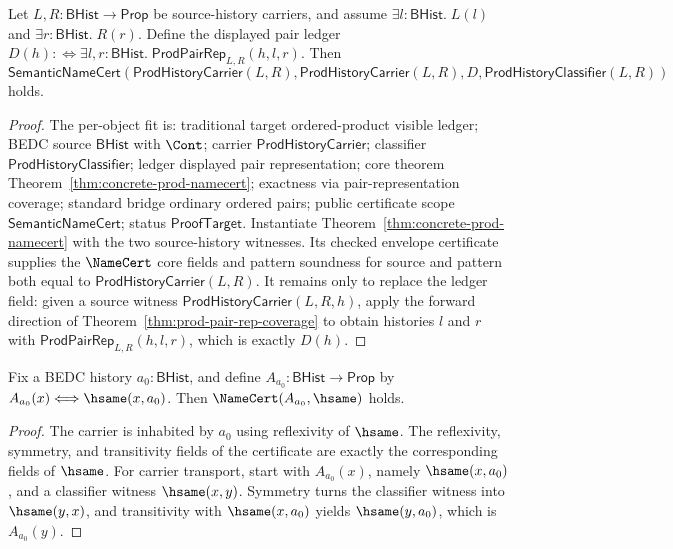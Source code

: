 \begin{theorem}
\label{thm:prod-checked-envelope-displayed-pair-ledger}
Let $L,R:\mathsf{BHist}\to\mathsf{Prop}$ be source-history carriers, and assume
$\exists l:\mathsf{BHist}.\;L(l)$ and $\exists r:\mathsf{BHist}.\;R(r)$.
Define the displayed pair ledger
$D(h):\Longleftrightarrow
\exists l,r:\mathsf{BHist}.\;\mathsf{ProdPairRep}_{L,R}(h,l,r)$. Then
$$
\mathsf{SemanticNameCert}(\mathsf{ProdHistoryCarrier}(L,R),
\mathsf{ProdHistoryCarrier}(L,R),
D,
\mathsf{ProdHistoryClassifier}(L,R))
$$
holds.
\end{theorem}
\begin{proof}
The per-object fit is: traditional target ordered-product visible ledger; BEDC
source $\mathsf{BHist}$ with $\Cont$; carrier
$\mathsf{ProdHistoryCarrier}$; classifier $\mathsf{ProdHistoryClassifier}$;
ledger displayed pair representation; core theorem
Theorem~\ref{thm:concrete-prod-namecert}; exactness via pair-representation
coverage; standard bridge ordinary ordered pairs; public certificate scope
$\mathsf{SemanticNameCert}$; status $\mathsf{ProofTarget}$. Instantiate
Theorem~\ref{thm:concrete-prod-namecert} with the two source-history witnesses.
Its checked envelope certificate supplies the $\NameCert$ core fields and
pattern soundness for source and pattern both equal to
$\mathsf{ProdHistoryCarrier}(L,R)$. It remains only to replace the ledger field:
given a source witness $\mathsf{ProdHistoryCarrier}(L,R,h)$, apply the forward
direction of Theorem~\ref{thm:prod-pair-rep-coverage} to obtain histories $l$
and $r$ with $\mathsf{ProdPairRep}_{L,R}(h,l,r)$, which is exactly $D(h)$.
\end{proof}

\begin{theorem}
\label{thm:singleton-history-source-namecert}
Fix a BEDC history $a_0:\mathsf{BHist}$, and define
$A_{a_0}:\mathsf{BHist}\to\mathsf{Prop}$ by
$A_{a_0}(x)\Longleftrightarrow\hsame(x,a_0)$. Then
$\NameCert(A_{a_0},\hsame)$ holds.
\end{theorem}
\begin{proof}
The carrier is inhabited by $a_0$ using reflexivity of $\hsame$. The
reflexivity, symmetry, and transitivity fields of the certificate are exactly
the corresponding fields of $\hsame$. For carrier transport, start with
$A_{a_0}(x)$, namely $\hsame(x,a_0)$, and a classifier witness
$\hsame(x,y)$. Symmetry turns the classifier witness into $\hsame(y,x)$, and
transitivity with $\hsame(x,a_0)$ yields $\hsame(y,a_0)$, which is
$A_{a_0}(y)$.
\end{proof}

